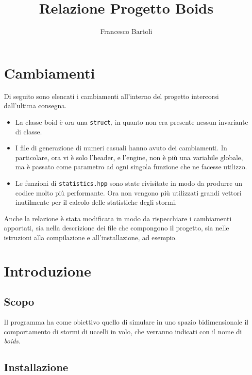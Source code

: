 \documentclass[10pt,a4paper]{article}
\title{Relazione Progetto Boids}
\author{Francesco Bartoli}
\date{}
\begin{document}
\maketitle

\hypertarget{toc}{}
\tableofcontents

\setlength{\parindent}{0pt}

\section*{Cambiamenti}

Di seguito sono elencati i cambiamenti all'interno del progetto intercorsi dall'ultima consegna.

\begin{itemize}
    \item La classe boid è ora una \texttt{struct}, in quanto non era presente nessun invariante di classe.
    \item I file di generazione di numeri casuali hanno avuto dei cambiamenti. In particolare, ora vi è solo l'header, e l'engine, non è più una variabile globale, ma è passato come parametro ad ogni singola funzione che ne facesse utilizzo.
    \item Le funzioni di \texttt{statistics.hpp} sono state rivisitate in modo da produrre un codice molto più performante. Ora non vengono più utilizzati grandi vettori inutilmente per il calcolo delle statistiche degli stormi.
\end{itemize}

Anche la relazione è stata modificata in modo da rispecchiare i cambiamenti apportati, sia nella descrizione dei file che compongono il progetto, sia nelle istruzioni alla compilazione e all'installazione, ad esempio.

\newpage

\parskip 1.6pt
\section{Introduzione}
\subsection{Scopo}
Il programma ha come obiettivo quello di simulare in uno spazio bidimensionale il comportamento di stormi di uccelli in volo, che verranno indicati con il nome di \textit{boids}.

\subsection{Installazione}
\end{document}
